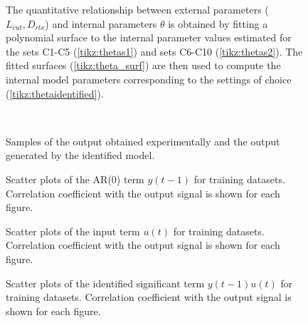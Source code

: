\documentclass[a4paper,11pt,twoside]{article}
\def\dataset{C}
\theoremstyle{mytheoremstyle}
\begin{document}
\begin{figure}[!t]
	\centering
	\resizebox{!}{0cm}{
		\begin{minipage}{\textwidth}
		
	\end{minipage}}
	
	\caption{The quantitative relationship between external parameters ($L_{cut}, D_{rlx}$) and internal parameters $\theta$ is obtained by fitting a polynomial surface to the internal parameter values estimated for the sets \dataset1-\dataset5 (\ref{tikz:thetas1}) and sets \dataset6-\dataset10 (\ref{tikz:thetas2}). The fitted surfaces (\ref{tikz:theta_surf}) are then used to compute the internal model parameters corresponding to the settings of choice (\ref{tikz:thetaidentified}).}\label{fig:surfaces_all}
\end{figure}
\begin{figure}[!t]
	\centering
	\subfloat[\dataset3]{\label{fig:c3all}}\\
	\subfloat[\dataset8]{\label{fig:c8all}}
	\caption{Samples of the output obtained experimentally and the output generated by the identified model.}\label{fig:Callout}
\end{figure}

\begin{figure}[!t]
	\centering
	
	\caption{Scatter plots of the AR(0) term $y(t-1)$ for training datasets. Correlation coefficient with the output signal is shown for each figure.}\label{fig:regr_y}
\end{figure}
\begin{figure}[!t]
	\centering
	
	\caption{Scatter plots of the input term $u(t)$ for training datasets. Correlation coefficient with the output signal is shown for each figure.}\label{fig:regr_u}
\end{figure}
\begin{figure}[!t]
	\centering
	
	\caption{Scatter plots of the identified significant term $y(t-1)u(t)$ for training datasets. Correlation coefficient with the output signal is shown for each figure.}\label{fig:regr_first}
\end{figure}
\end{document}
